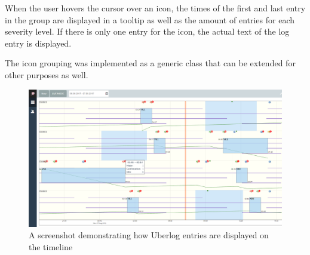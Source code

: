 When the user hovers the cursor over an icon, the times of the first and last entry in the group are displayed in a tooltip as well as the amount of entries for each severity level. If there is only one entry for the icon, the actual text of the log entry is displayed.

The icon grouping was implemented as a generic class that can be extended for other purposes as well.
 
\begin{figure}[ht]
  \begin{center}
    \includegraphics*[width=1\textwidth]{cluweb_uberlog}
  \end{center}
  \caption{A screenshot demonstrating how Uberlog entries are displayed on the timeline}
  \label{fig:cluweb_uberlog}
\end{figure}

